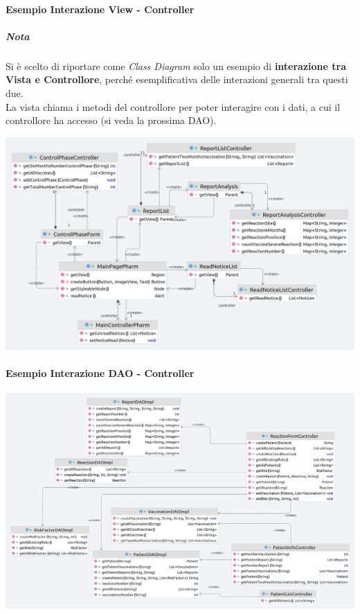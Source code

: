 \documentclass[11pt]{article}
\begin{document}
    \paragraph*{Esempio Interazione View - Controller}
        \subparagraph*{Nota} Si è scelto di riportare come \textit{Class Diagram} solo un esempio di \textbf{interazione tra Vista e Controllore}, perché esemplificativa delle interazioni generali tra questi due.\\
        La vista chiama i metodi del controllore per poter interagire con i dati, a cui il controllore ha accesso (si veda la prossima DAO).
        \begin{center}
            \includegraphics[width=1\textwidth]{pictures/ExampleControlViewInteraction.png}
        \end{center}
\newpage
    \paragraph*{Esempio Interazione DAO - Controller}
        \begin{center}
            \includegraphics[width=1\textwidth]{pictures/ControllerDati.png}
        \end{center}
\end{document}
